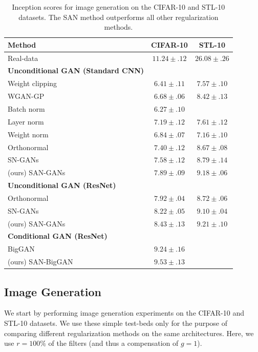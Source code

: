 \documentclass[letterpaper]{article} %
\begin{document}
\addtolength{\tabcolsep}{3pt} 
\begin{table}[t]
\begin{center}
\begin{tabular}{p{3cm} c c}
Method & CIFAR-10 & STL-10 \\ \hline \hline
Real-data & $11.24\pm .12$ & $26.08\pm .26$ \\ \hline
\textbf{Unconditional GAN (Standard CNN)} && \\
Weight clipping & $6.41\pm .11$ & $7.57 \pm .10$ \\
WGAN-GP & $ 6.68\pm .06$ & $ 8.42\pm .13$\\
Batch norm & $ 6.27 \pm .10$ &  \\
Layer norm & $ 7.19 \pm .12$ & $ 7.61\pm .12$\\
Weight norm & $6.84 \pm .07$ & $ 7.16\pm .10$\\
Orthonormal & $7.40 \pm .12$ & $8.67 \pm .08$\\
SN-GANs & $7.58 \pm .12$ & $8.79 \pm .14$\\
(ours) SAN-GANs & $\mathbf{7.89} \pm .09$ &  $\mathbf{9.18} \pm .06$\\ \hline
\textbf{Unconditional GAN (ResNet)} && \\
Orthonormal & $7.92 \pm .04$ & $8.72 \pm .06$ \\
SN-GANs & $8.22 \pm .05$ & $9.10 \pm .04$\\
(ours) SAN-GANs & $\mathbf{8.43} \pm .13$ & $\mathbf{9.21} \pm .10$\\  \hline
\textbf{Conditional GAN (ResNet)} &  & \\
BigGAN & $9.24 \pm .16$ & \\
(ours) SAN-BigGAN & $\mathbf{9.53} \pm .13$ & \\

\end{tabular}
\end{center}
\caption{Inception scores for image generation on the CIFAR-10 and STL-10 datasets. The SAN method outperforms all other regularization methods.}
\label{tab:generation}
\end{table}
\addtolength{\tabcolsep}{-3pt} 

\subsection{Image Generation}\label{image_generation}
We start by performing image generation experiments on the CIFAR-10 \cite{cifar} and STL-10 \cite{stl} datasets. We use these simple test-beds only for the purpose of comparing different regularization methods on the same architectures. Here, we use $r=100\%$ of the filters (and thus a compensation of $g=1$).
\end{document}
